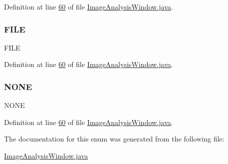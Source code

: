 Definition at line \hyperlink{_image_analysis_window_8java_source_l00060}{60} of file \hyperlink{_image_analysis_window_8java_source}{Image\+Analysis\+Window.\+java}.

\hypertarget{enumgui_1_1_image_analysis_window_1_1_type_of_analysis_a49ca3d2aae1b4847965178deb5633261}{}\label{enumgui_1_1_image_analysis_window_1_1_type_of_analysis_a49ca3d2aae1b4847965178deb5633261} 
\subsubsection{\texorpdfstring{F\+I\+LE}{FILE}}
{\footnotesize\ttfamily F\+I\+LE}



Definition at line \hyperlink{_image_analysis_window_8java_source_l00060}{60} of file \hyperlink{_image_analysis_window_8java_source}{Image\+Analysis\+Window.\+java}.

\hypertarget{enumgui_1_1_image_analysis_window_1_1_type_of_analysis_a899caa602e4fff675b17cdbab33607ec}{}\label{enumgui_1_1_image_analysis_window_1_1_type_of_analysis_a899caa602e4fff675b17cdbab33607ec} 
\subsubsection{\texorpdfstring{N\+O\+NE}{NONE}}
{\footnotesize\ttfamily N\+O\+NE}



Definition at line \hyperlink{_image_analysis_window_8java_source_l00060}{60} of file \hyperlink{_image_analysis_window_8java_source}{Image\+Analysis\+Window.\+java}.



The documentation for this enum was generated from the following file\+:\begin{DoxyCompactItemize}
\item 
\hyperlink{_image_analysis_window_8java}{Image\+Analysis\+Window.\+java}\end{DoxyCompactItemize}
